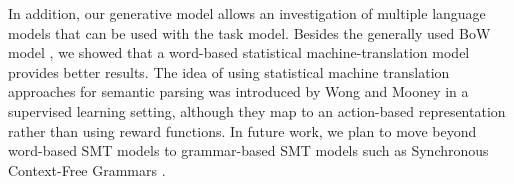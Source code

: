 \documentclass[conference]{IEEEtran}
\begin{document}
In addition, our generative model allows an investigation of multiple
language models that can be used with the task model. Besides the
generally used BoW model \cite{bkr09,vogel10}, we showed that
a word-based statistical machine-translation model provides better
results. The idea of using statistical machine translation approaches
for semantic parsing was introduced by Wong and Mooney \cite{wong07}
in a supervised learning setting, although they map to an action-based
representation rather than using reward functions. In future work, we
plan to move beyond word-based SMT models to grammar-based SMT models
such as Synchronous Context-Free Grammars \cite{Wu1997}.








\end{document}

